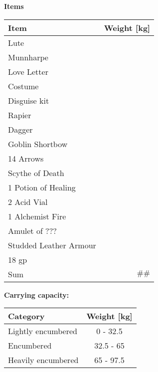 \documentclass[11pt]{article}
\begin{document}
\clearpage

	\begin{center}
{\LARGE \textbf{Items}}
	\end{center}

	\begin{tabularx}{\textwidth}{X|r}
Item & Weight [kg] \\
\hline
Lute 							&  	\\
Munnharpe						&	\\
Love Letter						&	\\
Costume							&	\\
Disguise kit					&	\\
Rapier							&	\\
Dagger							&	\\
Goblin Shortbow					&	\\
14 Arrows						&	\\
Scythe of Death					&	\\
1 Potion of Healing				&	\\
2 Acid Vial						&	\\
1 Alchemist Fire				&	\\
Amulet of ???					&	\\
Studded Leather Armour			&	\\
18 gp 							& 	\\
\hline
Sum 							& $\#\#$
	\end{tabularx}

\vspace{10mm}

\textbf{Carrying capacity:} \\

	\begin{tabular}{l|c}
Category & Weight [kg] \\
\hline
Lightly encumbered 	& 0 - 32.5 	\\
Encumbered 			& 32.5 - 65 \\
Heavily encumbered	& 65 - 97.5
	\end{tabular}
\end{document}
